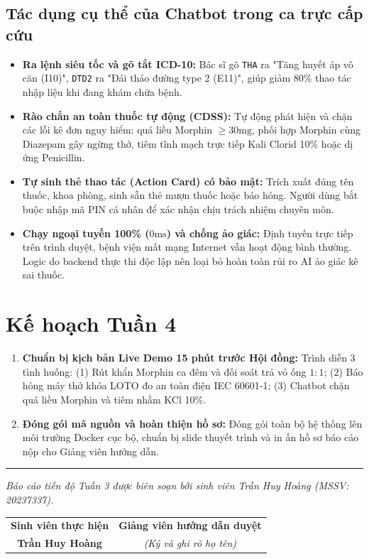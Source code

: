 \documentclass[11pt,a4paper]{article}
\begin{document}
\subsection{Tác dụng cụ thể của Chatbot trong ca trực cấp cứu}
\begin{itemize}[leftmargin=*, itemsep=0.03em, topsep=0.02em]
    \item \textbf{Ra lệnh siêu tốc và gõ tắt ICD-10:} Bác sĩ gõ \texttt{THA} ra "Tăng huyết áp vô căn (I10)", \texttt{DTD2} ra "Đái tháo đường type 2 (E11)", giúp giảm $80\%$ thao tác nhập liệu khi đang khám chữa bệnh.
    \item \textbf{Rào chắn an toàn thuốc tự động (CDSS):} Tự động phát hiện và chặn các lỗi kê đơn nguy hiểm: quá liều Morphin $\ge 30\text{mg}$, phối hợp Morphin cùng Diazepam gây ngừng thở, tiêm tĩnh mạch trực tiếp Kali Clorid 10\% hoặc dị ứng Penicillin.
    \item \textbf{Tự sinh thẻ thao tác (Action Card) có bảo mật:} Trích xuất đúng tên thuốc, khoa phòng, sinh sẵn thẻ mượn thuốc hoặc báo hỏng. Người dùng bắt buộc nhập mã PIN cá nhân để xác nhận chịu trách nhiệm chuyên môn.
    \item \textbf{Chạy ngoại tuyến 100\% ($0\text{ms}$) và chống ảo giác:} Định tuyến trực tiếp trên trình duyệt, bệnh viện mất mạng Internet vẫn hoạt động bình thường. Logic do backend thực thi độc lập nên loại bỏ hoàn toàn rủi ro AI ảo giác kê sai thuốc.
\end{itemize}

\vspace{-0.25em}
\section{Kế hoạch Tuần 4}
\begin{enumerate}[leftmargin=*, itemsep=0.04em, topsep=0.02em]
    \item \textbf{Chuẩn bị kịch bản Live Demo 15 phút trước Hội đồng:} Trình diễn 3 tình huống: (1) Rút khẩn Morphin ca đêm và đối soát trả vỏ ống $1:1$; (2) Báo hỏng máy thở khóa LOTO đo an toàn điện IEC 60601-1; (3) Chatbot chặn quá liều Morphin và tiêm nhầm KCl 10\%.
    \item \textbf{Đóng gói mã nguồn và hoàn thiện hồ sơ:} Đóng gói toàn bộ hệ thống lên môi trường Docker cục bộ, chuẩn bị slide thuyết trình và in ấn hồ sơ báo cáo nộp cho Giảng viên hướng dẫn.
\end{enumerate}

\vspace{0.25em}
\noindent\rule{\textwidth}{0.4pt}
\vspace{0.1em}

\begin{center}
\small
\textit{Báo cáo tiến độ Tuần 3 được biên soạn bởi sinh viên Trần Huy Hoàng (MSSV: 20237337).}\\[0.4em]
\begin{tabular*}{0.85\textwidth}{@{\extracolsep{\fill}}cc@{}}
\textbf{Sinh viên thực hiện} & \textbf{Giảng viên hướng dẫn duyệt} \\[1.8em]
\textbf{Trần Huy Hoàng} & \textit{(Ký và ghi rõ họ tên)} \\
\end{tabular*}
\end{center}
\end{document}
